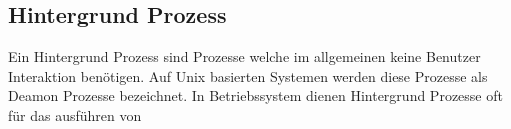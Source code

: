 \subsection{Hintergrund Prozess}

Ein Hintergrund Prozess sind Prozesse welche im allgemeinen keine Benutzer Interaktion benötigen. Auf Unix basierten Systemen werden diese Prozesse als Deamon Prozesse bezeichnet. In Betriebssystem dienen Hintergrund Prozesse oft für das ausführen von